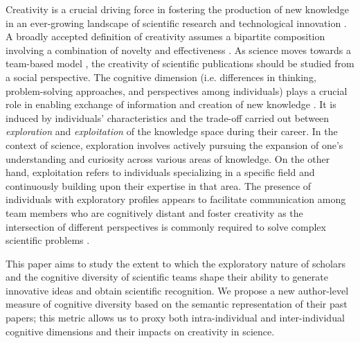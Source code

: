 Creativity is a crucial driving force in fostering the production of new knowledge in an ever-growing landscape of scientific research and technological innovation \citep{geuna1999economics,amendola2014novelty,witt2016propositions}. A broadly accepted definition of creativity assumes a bipartite composition involving a combination of novelty and effectiveness \citep{runco2012standard}. As science moves towards a team-based model \citep{wuchty2007increasing}, the creativity of scientific publications should be studied from a social perspective. The cognitive dimension (i.e. differences in thinking, problem-solving approaches, and perspectives among individuals) plays a crucial role in enabling exchange of information and creation of new knowledge \citep{nooteboom2000learning,nooteboom2007optimal}. It is induced by individuals' characteristics and the trade-off carried out between \textit{exploration} and \textit{exploitation} \citep{march1991exploration} of the knowledge space during their career. In the context of science, exploration involves actively pursuing the expansion of one's understanding and curiosity across various areas of knowledge. On the other hand, exploitation refers to individuals specializing in a specific field and continuously building upon their expertise in that area. The presence of individuals with exploratory profiles appears to facilitate communication among team members who are cognitively distant and foster creativity as the intersection of different perspectives is commonly required to solve complex scientific problems \citep{page2007}.

This paper aims to study the extent to which the exploratory nature of scholars and the cognitive diversity of scientific teams shape their ability to generate innovative ideas and obtain scientific recognition. We propose a new author-level measure of cognitive diversity based on the semantic representation of their past papers; this metric allows us to proxy both intra-individual and inter-individual cognitive dimensions and their impacts on creativity in science.

